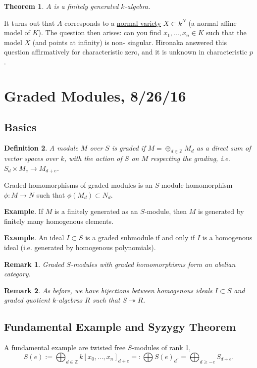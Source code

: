 \documentclass[letterpaper, 12pt]{article}
\newtheorem{rmk}{Remark}
\newtheorem{thm}{Theorem}[subsection]
\newtheorem{definition}[thm]{Definition}
\newcommand{\Z}{\mathbb{Z}}
\newcommand{\polyring}[3]{#1[x_{#2}, ..., x_{#3}]}
\begin{document}
\begin{thm} $A$ is a finitely generated $k$-algebra. \end{thm}

It turns out that $A$ corresponds to a \uline{normal variety} $X \subset k^N$
(a normal affine model of $K$). The question then arises: can you find $x_1,
..., x_n \in K$ such that the model $X$ (and points at infinity) is non-
singular. Hironaka answered this question affirmatively for characteristic
zero, and it is unknown in characteristic $p$.

\section{Graded Modules, 8/26/16}
\subsection{Basics}
\begin{definition}
  A module $M$ over $S$ is graded if $M = \oplus_{d \in \Z} M_d$ as a direct sum of vector spaces over $k$, with the action of $S$ on $M$ respecting the grading, i.e. $S_d \times M_e \rightarrow M_{d + e}$.
\end{definition}

Graded homomorphisms of graded modules is an $S$-module homomorphism $\phi : M \rightarrow N$ such that $\phi(M_d) \subset N_d$.

\textbf{Example}. If $M$ is a finitely generated as an $S$-module, then $M$ is generated by finitely many homogenous elements.

\textbf{Example}. An ideal $I \subset S$ is a graded submodule if and only if $I$ is a homogenous ideal (i.e. generated by homogenous polynomials).

\begin{rmk}
  Graded $S$-modules with graded homomorphisms form an abelian category.
\end{rmk}

\begin{rmk}
  As before, we have bijections between homogenous ideals $I \subset S$ and graded quotient $k$-algebras $R$ such that $S \twoheadrightarrow R$.
\end{rmk}

\subsection{Fundamental Example and Syzygy Theorem}
A fundamental example are twisted free $S$-modules of rank 1, \[ S(e) := \bigoplus_{d \in \Z} {\polyring k 0 n}_{d + e} =: \bigoplus S(e)_d. = \bigoplus_{d \geq -e} S_{d + e}. \]
\end{document}
